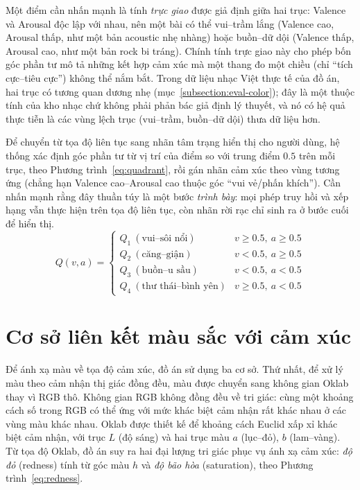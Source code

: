 \documentclass[../DoAn.tex]{subfiles}
\begin{document}
Một điểm cần nhấn mạnh là tính \textit{trực giao} được giả định giữa hai trục: Valence và Arousal độc lập với nhau, nên một bài có thể vui--trầm lắng (Valence cao, Arousal thấp, như một bản acoustic nhẹ nhàng) hoặc buồn--dữ dội (Valence thấp, Arousal cao, như một bản rock bi tráng). Chính tính trực giao này cho phép bốn góc phần tư mô tả những kết hợp cảm xúc mà một thang đo một chiều (chỉ ``tích cực--tiêu cực'') không thể nắm bắt. Trong dữ liệu nhạc Việt thực tế của đồ án, hai trục có tương quan dương nhẹ (mục~\ref{subsection:eval-color}); đây là một thuộc tính của kho nhạc chứ không phải phản bác giả định lý thuyết, và nó có hệ quả thực tiễn là các vùng lệch trục (vui--trầm, buồn--dữ dội) thưa dữ liệu hơn.

Để chuyển từ tọa độ liên tục sang nhãn tâm trạng hiển thị cho người dùng, hệ thống xác định góc phần tư từ vị trí của điểm so với trung điểm $0.5$ trên mỗi trục, theo Phương trình~\eqref{eq:quadrant}, rồi gán nhãn cảm xúc theo vùng tương ứng (chẳng hạn Valence cao--Arousal cao thuộc góc ``vui vẻ/phấn khích''). Cần nhấn mạnh rằng đây thuần túy là một bước \textit{trình bày}: mọi phép truy hồi và xếp hạng vẫn thực hiện trên tọa độ liên tục, còn nhãn rời rạc chỉ sinh ra ở bước cuối để hiển thị.
\begin{equation}\label{eq:quadrant}
Q(v,a) = \begin{cases}
Q_1\ (\text{vui--sôi nổi}) & v \ge 0.5,\ a \ge 0.5 \\
Q_2\ (\text{căng--giận}) & v < 0.5,\ a \ge 0.5 \\
Q_3\ (\text{buồn--u sầu}) & v < 0.5,\ a < 0.5 \\
Q_4\ (\text{thư thái--bình yên}) & v \ge 0.5,\ a < 0.5
\end{cases}
\end{equation}

\section{Cơ sở liên kết màu sắc với cảm xúc}
\label{section:3.2}
Để ánh xạ màu về tọa độ cảm xúc, đồ án sử dụng ba cơ sở. Thứ nhất, để xử lý màu theo cảm nhận thị giác đồng đều, màu được chuyển sang không gian Oklab \cite{ottosson2020oklab} thay vì RGB thô. Không gian RGB không đồng đều về tri giác: cùng một khoảng cách số trong RGB có thể ứng với mức khác biệt cảm nhận rất khác nhau ở các vùng màu khác nhau. Oklab được thiết kế để khoảng cách Euclid xấp xỉ khác biệt cảm nhận, với trục $L$ (độ sáng) và hai trục màu $a$ (lục--đỏ), $b$ (lam--vàng). Từ tọa độ Oklab, đồ án suy ra hai đại lượng tri giác phục vụ ánh xạ cảm xúc: \textit{độ đỏ} (redness) tính từ góc màu $h$ và \textit{độ bão hòa} (saturation), theo Phương trình~\eqref{eq:redness}.
\end{document}
